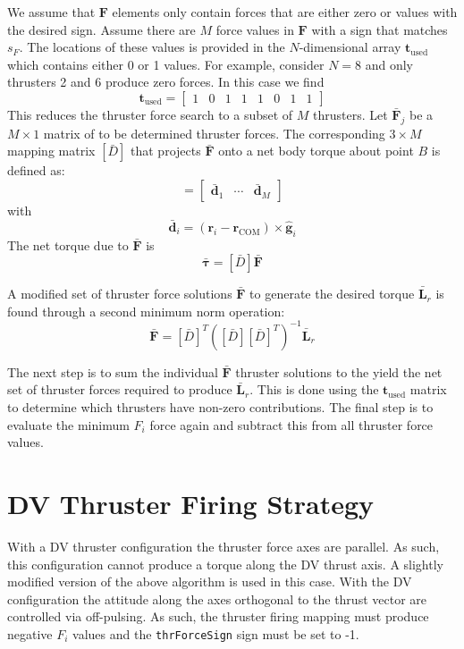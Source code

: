 \documentclass[]{BasiliskReportMemo}
\begin{document}
We assume that $\bm F$ elements only contain forces that are either zero or values with the desired sign.   Assume there are $M$  force values in $\bm F$ with a sign that matches $s_{F}$.  The locations of these values is provided in the $N$-dimensional array $\bm t_{\text{used}}$ which contains either 0 or 1 values.  For example, consider $N=8$ and only thrusters 2 and 6 produce  zero forces. In this case we find
\begin{equation}
	\bm t_{\text{used}} = \begin{bmatrix}
		1 & 0 & 1 & 1 & 1 & 0 & 1 & 1
	\end{bmatrix}
\end{equation}
This reduces the thruster force search to a subset of $M$ thrusters.  Let $\bar{\bm F}_{j}$ be a $M\times 1$ matrix of to be determined thruster forces.  The corresponding $3\times M$ mapping matrix $[\bar D]$ that projects $\bar{\bm F}$ onto a net body torque about point $B$ is defined as:
\begin{equation}
	[\bar D] = \begin{bmatrix} \bar{\bm d}_{1} & \cdots & \bar{\bm d}_{M} \end{bmatrix}
\end{equation}
with
\begin{equation}
	\bar{\bm d}_{i} = (\bm r_{i} - \bm r_{\text{COM}}) \times \hat{\bm g}_{i}
\end{equation}
The net torque due to $\bar{\bm F}$ is 
\begin{equation}
	\bar{\bm \tau} = [\bar D] \bar{\bm F}
\end{equation}

A modified set of thruster force solutions $\bar{\bm F}$ to generate the desired torque $\bar{\bm L}_{r}$ is found through a second minimum norm operation:
\begin{equation}
	\label{eq:th:min2}
	\bar{\bm F} = [\bar D]^{T}([\bar D][\bar D]^{T})^{-1} \bar{\bm L}_{r}
\end{equation}




The next step is to sum the individual $\bar{\bm F}$ thruster solutions to the yield the net set of thruster forces required to produce $\bar{\bm L}_{r}$.  This is done using the  $\bm t_{\text{used}}$ matrix to determine which thrusters have non-zero contributions.   The final step is to evaluate the minimum $F_{i}$ force again and subtract this from all thruster force values.




\section{DV Thruster Firing Strategy}
With a DV thruster configuration the thruster force axes are parallel.  As such, this configuration cannot produce a torque along the DV thrust axis.  A slightly modified version of the above algorithm is used in this case.  With the DV configuration the attitude along the axes orthogonal to the thrust vector are controlled via off-pulsing.  As such, the thruster firing mapping must produce negative $F_{i}$ values and the {\tt thrForceSign} sign must be set to -1.  
\end{document}
